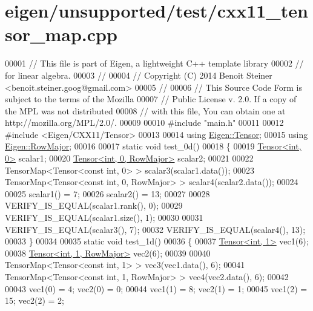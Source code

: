 \hypertarget{eigen_2unsupported_2test_2cxx11__tensor__map_8cpp_source}{}\section{eigen/unsupported/test/cxx11\+\_\+tensor\+\_\+map.cpp}
\label{eigen_2unsupported_2test_2cxx11__tensor__map_8cpp_source}

\begin{DoxyCode}
00001 \textcolor{comment}{// This file is part of Eigen, a lightweight C++ template library}
00002 \textcolor{comment}{// for linear algebra.}
00003 \textcolor{comment}{//}
00004 \textcolor{comment}{// Copyright (C) 2014 Benoit Steiner <benoit.steiner.goog@gmail.com>}
00005 \textcolor{comment}{//}
00006 \textcolor{comment}{// This Source Code Form is subject to the terms of the Mozilla}
00007 \textcolor{comment}{// Public License v. 2.0. If a copy of the MPL was not distributed}
00008 \textcolor{comment}{// with this file, You can obtain one at http://mozilla.org/MPL/2.0/.}
00009 
00010 \textcolor{preprocessor}{#include "main.h"}
00011 
00012 \textcolor{preprocessor}{#include <Eigen/CXX11/Tensor>}
00013 
00014 \textcolor{keyword}{using} \hyperlink{class_eigen_1_1_tensor}{Eigen::Tensor};
00015 \textcolor{keyword}{using} \hyperlink{group__enums_ggaacded1a18ae58b0f554751f6cdf9eb13acfcde9cd8677c5f7caf6bd603666aae3}{Eigen::RowMajor};
00016 
00017 \textcolor{keyword}{static} \textcolor{keywordtype}{void} test\_0d()
00018 \{
00019   \hyperlink{class_eigen_1_1_tensor}{Tensor<int, 0>} scalar1;
00020   \hyperlink{class_eigen_1_1_tensor}{Tensor<int, 0, RowMajor>} scalar2;
00021 
00022   TensorMap<Tensor<const int, 0> > scalar3(scalar1.data());
00023   TensorMap<Tensor<const int, 0, RowMajor> > scalar4(scalar2.data());
00024 
00025   scalar1() = 7;
00026   scalar2() = 13;
00027 
00028   VERIFY\_IS\_EQUAL(scalar1.rank(), 0);
00029   VERIFY\_IS\_EQUAL(scalar1.size(), 1);
00030 
00031   VERIFY\_IS\_EQUAL(scalar3(), 7);
00032   VERIFY\_IS\_EQUAL(scalar4(), 13);
00033 \}
00034 
00035 \textcolor{keyword}{static} \textcolor{keywordtype}{void} test\_1d()
00036 \{
00037   \hyperlink{class_eigen_1_1_tensor}{Tensor<int, 1>} vec1(6);
00038   \hyperlink{class_eigen_1_1_tensor}{Tensor<int, 1, RowMajor>} vec2(6);
00039 
00040   TensorMap<Tensor<const int, 1> > vec3(vec1.data(), 6);
00041   TensorMap<Tensor<const int, 1, RowMajor> > vec4(vec2.data(), 6);
00042 
00043   vec1(0) = 4;  vec2(0) = 0;
00044   vec1(1) = 8;  vec2(1) = 1;
00045   vec1(2) = 15; vec2(2) = 2;

\end{DoxyCode}
